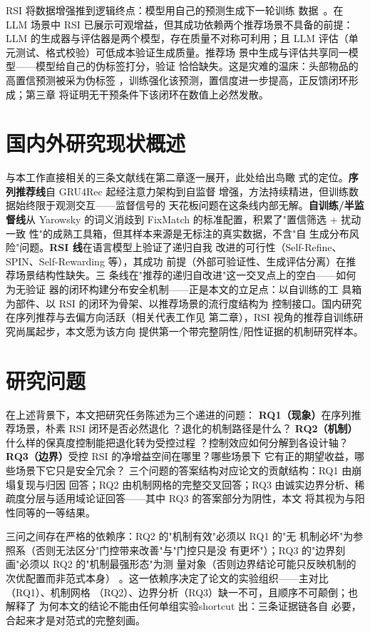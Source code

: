 RSI 将数据增强推到逻辑终点：模型用自己的预测生成下一轮训练
数据~\cite{madaan2023selfrefine,chen2024spin}。在 LLM 场景中
RSI 已展示可观增益，但其成功依赖两个推荐场景不具备的前提：
LLM 的生成器与评估器是两个模型，存在质量不对称可利用；且
LLM 评估（单元测试、格式校验）可低成本验证生成质量。推荐场
景中生成与评估共享同一模型——模型给自己的伪标签打分，验证
恰恰缺失。这是灾难的温床：头部物品的高置信预测被采为伪标签
，训练强化该预测，置信度进一步提高，正反馈闭环形成；第三章
将证明无干预条件下该闭环在数值上必然发散。

\section{国内外研究现状概述}
与本工作直接相关的三条文献线在第二章逐一展开，此处给出鸟瞰
式的定位。\textbf{序列推荐线}自 GRU4Rec 起经注意力架构到自监督
增强，方法持续精进，但训练数据始终限于观测交互——监督信号的
天花板问题在这条线内部无解。\textbf{自训练/半监督线}从 Yarowsky
的词义消歧到 FixMatch 的标准配置，积累了"置信筛选 + 扰动一致
性"的成熟工具箱，但其样本来源是无标注的真实数据，不含"自
生成分布风险"问题。\textbf{RSI 线}在语言模型上验证了递归自我
改进的可行性（Self-Refine、SPIN、Self-Rewarding 等），其成功
前提（外部可验证性、生成评估分离）在推荐场景结构性缺失。三
条线在"推荐的递归自改进"这一交叉点上的空白——如何为无验证
器的闭环构建分布安全机制——正是本文的立足点：以自训练的工
具箱为部件、以 RSI 的闭环为骨架、以推荐场景的流行度结构为
控制接口。国内研究在序列推荐与去偏方向活跃（相关代表工作见
第二章），RSI 视角的推荐自训练研究尚属起步，本文愿为该方向
提供第一个带完整阴性/阳性证据的机制研究样本。

\section{研究问题}\label{sec:questions}
在上述背景下，本文把研究任务陈述为三个递进的问题：
\textbf{RQ1（现象）}在序列推荐场景，朴素 RSI 闭环是否必然退化
？退化的机制路径是什么？
\textbf{RQ2（机制）}什么样的保真度控制能把退化转为受控过程
？控制效应如何分解到各设计轴？
\textbf{RQ3（边界）}受控 RSI 的净增益空间在哪里？哪些场景下
它有正的期望收益，哪些场景下它只是安全冗余？
三个问题的答案结构对应论文的贡献结构：RQ1 由崩塌复现与归因
回答；RQ2 由机制网格的完整交叉回答；RQ3 由诚实边界分析、稀
疏度分层与适用域论证回答——其中 RQ3 的答案部分为阴性，本文
将其视为与阳性同等的一等结果。

三问之间存在严格的依赖序：RQ2 的"机制有效"必须以 RQ1 的"无
机制必坏"为参照系（否则无法区分"门控带来改善"与"门控只是没
有更坏"）；RQ3 的"边界刻画"必须以 RQ2 的"机制最强形态"为测
量对象（否则边界结论可能只反映机制的次优配置而非范式本身）
。这一依赖序决定了论文的实验组织——主对比（RQ1）、机制网格
（RQ2）、边界分析（RQ3）缺一不可，且顺序不可颠倒；也解释了
为何本文的结论不能由任何单组实验shortcut 出：三条证据链各自
必要，合起来才是对范式的完整刻画。


